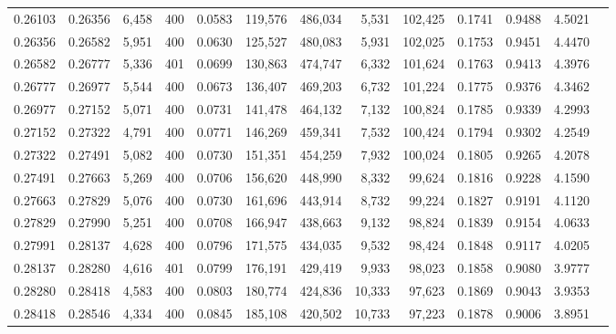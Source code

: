 \begin{tabular}{rrrrrrrrrrrrr}
0.26103 & 0.26356 &  6,458 & 400 &                                     0.0583 & 119,576 & 486,034 &   5,531 & 102,425 & 0.1741 & 0.9488 & 4.5021 \\
0.26356 & 0.26582 &  5,951 & 400 &                                     0.0630 & 125,527 & 480,083 &   5,931 & 102,025 & 0.1753 & 0.9451 & 4.4470 \\
0.26582 & 0.26777 &  5,336 & 401 &                                     0.0699 & 130,863 & 474,747 &   6,332 & 101,624 & 0.1763 & 0.9413 & 4.3976 \\
0.26777 & 0.26977 &  5,544 & 400 &                                     0.0673 & 136,407 & 469,203 &   6,732 & 101,224 & 0.1775 & 0.9376 & 4.3462 \\
0.26977 & 0.27152 &  5,071 & 400 &                                     0.0731 & 141,478 & 464,132 &   7,132 & 100,824 & 0.1785 & 0.9339 & 4.2993 \\
0.27152 & 0.27322 &  4,791 & 400 &                                     0.0771 & 146,269 & 459,341 &   7,532 & 100,424 & 0.1794 & 0.9302 & 4.2549 \\
0.27322 & 0.27491 &  5,082 & 400 &                                     0.0730 & 151,351 & 454,259 &   7,932 & 100,024 & 0.1805 & 0.9265 & 4.2078 \\
0.27491 & 0.27663 &  5,269 & 400 &                                     0.0706 & 156,620 & 448,990 &   8,332 &  99,624 & 0.1816 & 0.9228 & 4.1590 \\
0.27663 & 0.27829 &  5,076 & 400 &                                     0.0730 & 161,696 & 443,914 &   8,732 &  99,224 & 0.1827 & 0.9191 & 4.1120 \\
0.27829 & 0.27990 &  5,251 & 400 &                                     0.0708 & 166,947 & 438,663 &   9,132 &  98,824 & 0.1839 & 0.9154 & 4.0633 \\
0.27991 & 0.28137 &  4,628 & 400 &                                     0.0796 & 171,575 & 434,035 &   9,532 &  98,424 & 0.1848 & 0.9117 & 4.0205 \\
0.28137 & 0.28280 &  4,616 & 401 &                                     0.0799 & 176,191 & 429,419 &   9,933 &  98,023 & 0.1858 & 0.9080 & 3.9777 \\
0.28280 & 0.28418 &  4,583 & 400 &                                     0.0803 & 180,774 & 424,836 &  10,333 &  97,623 & 0.1869 & 0.9043 & 3.9353 \\
0.28418 & 0.28546 &  4,334 & 400 &                                     0.0845 & 185,108 & 420,502 &  10,733 &  97,223 & 0.1878 & 0.9006 & 3.8951 \\

\end{tabular}

